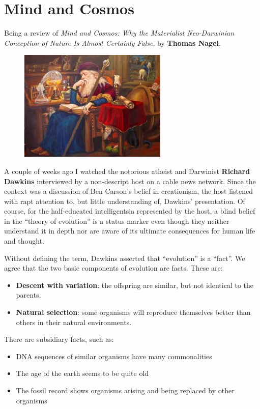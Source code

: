\section{Mind and Cosmos}

\label{sec:MindandCosmos}
Being a review of \emph{Mind and Cosmos: Why the Materialist Neo-Darwinian Conception of Nature Is Almost Certainly
False}, by \textbf{Thomas Nagel}.

\begin{figure}
 \includegraphics[scale=.5]{a20151111MindandCosmos-img001.jpg}
\end{figure}

A couple of weeks ago I watched the notorious atheist and Darwinist \textbf{Richard Dawkins} interviewed by a
non-descript host on a cable news network. Since the context was a discussion of Ben Carson's belief in
creationism, the host listened with rapt attention to, but little understanding of, Dawkins' presentation.
Of course, for the half-educated intelligentsia represented by the host, a blind belief in the “theory of evolution” is
a status marker even though they neither understand it in depth nor are aware of its ultimate consequences for human
life and thought.

Without defining the term, Dawkins asserted that “evolution” is a “fact”. We agree that the two basic components of
evolution are facts. These are:

\begin{itemize}
\item \textbf{Descent with variation}: the offspring are similar, but not identical to the parents. 
\item \textbf{Natural selection}: some organisms will reproduce themselves better than others in their natural
environments. 
\end{itemize}
There are subsidiary facts, such as:

\begin{itemize}
\item DNA sequences of similar organisms have many commonalities 
\item The age of the earth seems to be quite old 
\item The fossil record shows organisms arising and being replaced by other organisms 
\end{itemize}

